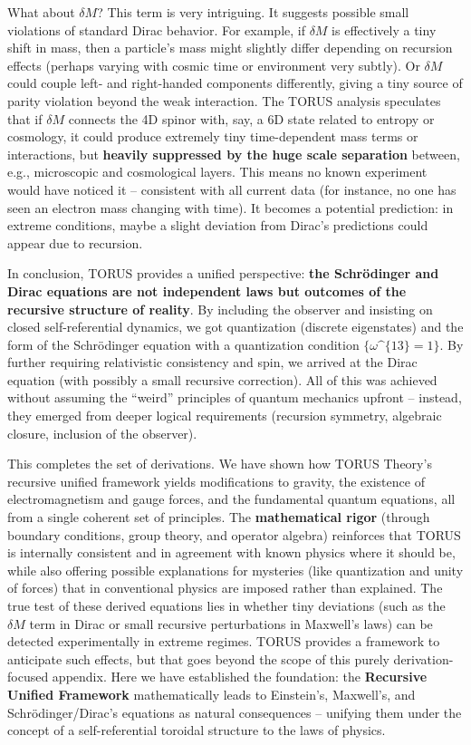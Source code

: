 \documentclass[]{article}
\begin{document}
What about $\delta M$? This term is very intriguing. It
suggests possible small violations of standard Dirac behavior. For
example, if $\delta M$ is effectively a tiny shift in
mass, then a particle's mass might slightly differ depending on
recursion effects (perhaps varying with cosmic time or environment very
subtly). Or $\delta M$ could couple left- and
right-handed components differently, giving a tiny source of parity
violation beyond the weak interaction. The TORUS analysis speculates
that if $\delta M$ connects the 4D spinor with, say, a
6D state related to entropy or cosmology, it could produce extremely
tiny time-dependent mass terms or interactions, but \textbf{heavily
suppressed by the huge scale separation} between, e.g., microscopic and
cosmological layers​. This means no known experiment would have noticed
it -- consistent with all current data (for instance, no one has seen an
electron mass changing with time). It becomes a potential prediction: in
extreme conditions, maybe a slight deviation from Dirac's predictions
could appear due to recursion.

In conclusion, TORUS provides a unified perspective: \textbf{the
Schrödinger and Dirac equations are not independent laws but outcomes of
the recursive structure of reality}. By including the observer and
insisting on closed self-referential dynamics, we got quantization
(discrete eigenstates) and the form of the Schrödinger equation with a
quantization condition $\{\omega\^{}\{13\}=1\}$​. By
further requiring relativistic consistency and spin, we arrived at the
Dirac equation (with possibly a small recursive correction)​. All of
this was achieved without assuming the ``weird'' principles of quantum
mechanics upfront -- instead, they emerged from deeper logical
requirements (recursion symmetry, algebraic closure, inclusion of the
observer).

This completes the set of derivations. We have shown how TORUS Theory's
recursive unified framework yields modifications to gravity, the
existence of electromagnetism and gauge forces, and the fundamental
quantum equations, all from a single coherent set of principles. The
\textbf{mathematical rigor} (through boundary conditions, group theory,
and operator algebra) reinforces that TORUS is internally consistent and
in agreement with known physics where it should be, while also offering
possible explanations for mysteries (like quantization and unity of
forces) that in conventional physics are imposed rather than explained.
The true test of these derived equations lies in whether tiny deviations
(such as the $\delta M$ term in Dirac or small
recursive perturbations in Maxwell's laws) can be detected
experimentally in extreme regimes. TORUS provides a framework to
anticipate such effects​, but that goes beyond the scope of this purely
derivation-focused appendix. Here we have established the foundation:
the \textbf{Recursive Unified Framework} mathematically leads to
Einstein's, Maxwell's, and Schrödinger/Dirac's equations as natural
consequences -- unifying them under the concept of a self-referential
toroidal structure to the laws of physics.
\end{document}
